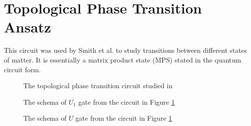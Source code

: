 \section{Topological Phase Transition Ansatz}
This circuit was used by Smith et al. \cite{smith2020crossing} to study
transitions between different states of matter. It is essentially a matrix
product state (MPS) stated in the quantum circuit form.
\label{apx:topological_phase_transition_ansatz}
\begin{figure}[htbp!]
  \caption{The topological phase transition circuit studied in \cite{smith2020crossing} }
  \label{fig:phase_circuit_apx}
\end{figure}
\begin{figure}[htbp!]
  \caption{The schema of $U_1$ gate from the circuit in Figure \ref{fig:phase_circuit_apx}}
  \label{fig:phase_circuit_u1}
\end{figure}
\begin{figure}[htbp!]
  \caption{The schema of $U$ gate from the circuit in Figure \ref{fig:phase_circuit_apx}}
  \label{fig:phase_circuit_u}
\end{figure}

